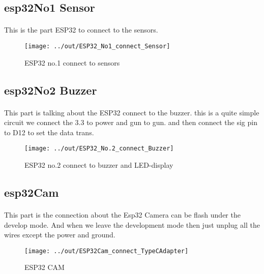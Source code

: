 \documentclass[12pt, a4, utf8]{report}        %
\begin{document}
    \blindtext{}


    \subsection{esp32No1 Sensor}\label{subsec:esp32no1-sensor}
    \paragraph{}
    This is the part ESP32 to connect to the sensors.

    \blindtext{}



    \begin{figure}[h]
        \caption{ESP32 no.1 connect to sensors}
        \centering
        \texttt{[image: ../out/ESP32\_No1\_connect\_Sensor]}
        \label{fig:figure2}
    \end{figure}


    \subsection{esp32No2 Buzzer}\label{subsec:esp32no2-buzzer}
    \paragraph{}
    This part is talking about the ESP32 connect to the buzzer.
    this is a quite simple circuit we connect the 3.3 to power and gun to gun.
    and then connect the sig pin to D12 to set the data trans.

    \blindtext{}



    \begin{figure}[h]
        \caption{ESP32 no.2 connect to buzzer and LED-display}\label{fig:figure3}
        \centering
        \texttt{[image: ../out/ESP32\_No.2\_connect\_Buzzer]}
    \end{figure}

    \subsection{esp32Cam }\label{subsec:esp32cam}
    \paragraph{}
    This part is the connection about the Esp32 Camera can be flash under the develop mode.
    And when we leave the development mode then just unplug all the wires except the power and ground.

    \blindtext{}



    \begin{figure}[h]
        \caption{ESP32 CAM}\label{fig:figure4}
        \centering
        \texttt{[image: ../out/ESP32Cam\_connect\_TypeCAdapter]}
    \end{figure}



    
    
\end{document}
